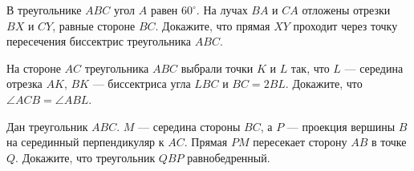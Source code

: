 \documentclass{article}
\begin{document}
\begin{enumerate_boxed}
        \item В треугольнике $ABC$ угол $A$ равен $60^\circ$.
        На лучах $BA$ и $CA$ отложены отрезки $BX$ и $CY$, равные стороне $BC$.
        Докажите, что прямая $XY$ проходит через точку пересечения биссектрис треугольника $ABC$.

        \item На стороне $AC$ треугольника $ABC$ выбрали точки $K$ и $L$ так, что $L$ — середина отрезка $AK$, $BK$ — биссектриса угла $LBC$ и $BC=2BL$.
        Докажите, что $\angle ACB= \angle ABL$.

        \item Дан треугольник $ABC$. $M$ — середина стороны $BC$, а $P$ — проекция вершины $B$ на серединный перпендикуляр к $AC$.
        Прямая $PM$ пересекает сторону $AB$ в точке $Q$.
        Докажите, что треугольник $QBP$ равнобедренный.


    \end{enumerate_boxed}
\end{document}
